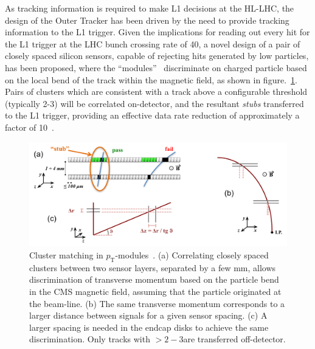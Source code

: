 As tracking information is required to make L1 decisions at the HL-LHC, the design of the Outer Tracker has been driven by the need to provide tracking information to the L1 trigger.
Given the implications for reading out every hit for the L1 trigger at the LHC bunch crossing rate of 40\MHz, a novel design of a pair of closely spaced silicon sensors, capable of rejecting hits generated by low \pT particles, has been proposed, where the ``\pT modules''~\cite{jjonespixel,markthesis} discriminate on charged particle \pT based on the local bend of the track within the magnetic field, as shown in figure.~\ref{fig:stubs}.
Pairs of clusters which are consistent with a track \pT above a configurable threshold (typically 2-3\GeV) will be correlated on-detector, and the resultant \emph{stubs} transferred to the L1 trigger, providing an effective data rate reduction of approximately a factor of 10~\cite{mpessimperf,2dptmoduleconcept}.

\begin{figure}[!t]
\centering
\includegraphics[width=5in]{figs/tk-upgrade/pTsketches.png}
\caption{Cluster matching in $p_\mathrm{T}$-modules~\cite{P2TrackerTDR}. (a) Correlating closely spaced clusters between two sensor layers, separated by a few mm, allows discrimination of transverse momentum based on the particle bend in the CMS magnetic field, assuming that the particle originated at the beam-line. (b) The same transverse momentum corresponds to a larger distance between signals for a given sensor spacing. (c) A larger spacing is needed in the endcap disks to achieve the same discrimination. Only tracks with \pT $> 2-3$\GeVc are transferred off-detector.
}
\label{fig:stubs}
\end{figure}

